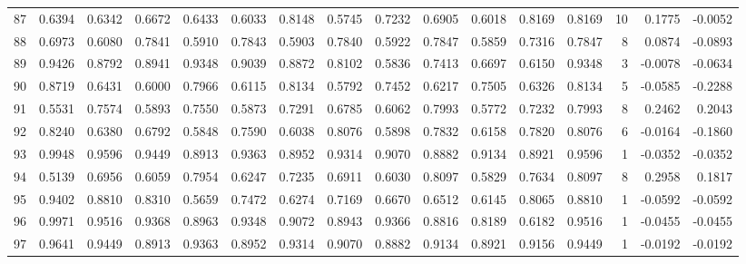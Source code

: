 \begin{tabular}{lrrrrrrrrrrrrrrr}
87  &      0.6394 &  0.6342 &  0.6672 &  0.6433 &  0.6033 &  0.8148 &  0.5745 &  0.7232 &  0.6905 &  0.6018 &   0.8169 &     0.8169 &     10 &                    0.1775 &                    -0.0052 \\
88  &      0.6973 &  0.6080 &  0.7841 &  0.5910 &  0.7843 &  0.5903 &  0.7840 &  0.5922 &  0.7847 &  0.5859 &   0.7316 &     0.7847 &      8 &                    0.0874 &                    -0.0893 \\
89  &      0.9426 &  0.8792 &  0.8941 &  0.9348 &  0.9039 &  0.8872 &  0.8102 &  0.5836 &  0.7413 &  0.6697 &   0.6150 &     0.9348 &      3 &                   -0.0078 &                    -0.0634 \\
90  &      0.8719 &  0.6431 &  0.6000 &  0.7966 &  0.6115 &  0.8134 &  0.5792 &  0.7452 &  0.6217 &  0.7505 &   0.6326 &     0.8134 &      5 &                   -0.0585 &                    -0.2288 \\
91  &      0.5531 &  0.7574 &  0.5893 &  0.7550 &  0.5873 &  0.7291 &  0.6785 &  0.6062 &  0.7993 &  0.5772 &   0.7232 &     0.7993 &      8 &                    0.2462 &                     0.2043 \\
92  &      0.8240 &  0.6380 &  0.6792 &  0.5848 &  0.7590 &  0.6038 &  0.8076 &  0.5898 &  0.7832 &  0.6158 &   0.7820 &     0.8076 &      6 &                   -0.0164 &                    -0.1860 \\
93  &      0.9948 &  0.9596 &  0.9449 &  0.8913 &  0.9363 &  0.8952 &  0.9314 &  0.9070 &  0.8882 &  0.9134 &   0.8921 &     0.9596 &      1 &                   -0.0352 &                    -0.0352 \\
94  &      0.5139 &  0.6956 &  0.6059 &  0.7954 &  0.6247 &  0.7235 &  0.6911 &  0.6030 &  0.8097 &  0.5829 &   0.7634 &     0.8097 &      8 &                    0.2958 &                     0.1817 \\
95  &      0.9402 &  0.8810 &  0.8310 &  0.5659 &  0.7472 &  0.6274 &  0.7169 &  0.6670 &  0.6512 &  0.6145 &   0.8065 &     0.8810 &      1 &                   -0.0592 &                    -0.0592 \\
96  &      0.9971 &  0.9516 &  0.9368 &  0.8963 &  0.9348 &  0.9072 &  0.8943 &  0.9366 &  0.8816 &  0.8189 &   0.6182 &     0.9516 &      1 &                   -0.0455 &                    -0.0455 \\
97  &      0.9641 &  0.9449 &  0.8913 &  0.9363 &  0.8952 &  0.9314 &  0.9070 &  0.8882 &  0.9134 &  0.8921 &   0.9156 &     0.9449 &      1 &                   -0.0192 &                    -0.0192 \\

\end{tabular}
